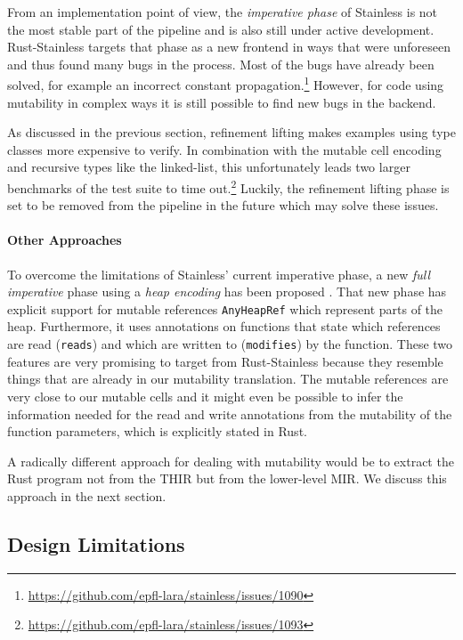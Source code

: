 From an implementation point of view, the \emph{imperative phase} of Stainless
is not the most stable part of the pipeline and is also still under active
development. Rust-Stainless targets that phase as a new frontend in ways that
were unforeseen and thus found many bugs in the process. Most of the bugs have
already been solved, for example an incorrect constant
propagation.\footnote{\url{https://github.com/epfl-lara/stainless/issues/1090}}
However, for code using mutability in complex ways it is still possible to find
new bugs in the backend.

As discussed in the previous section, refinement lifting makes examples using
type classes more expensive to verify. In combination with the mutable cell
encoding and recursive types like the linked-list, this unfortunately leads two
larger benchmarks of the test suite to time
out.\footnote{\url{https://github.com/epfl-lara/stainless/issues/1093}} Luckily,
the refinement lifting phase is set to be removed from the pipeline in the
future which may solve these issues.

\paragraph{Other Approaches}

To overcome the limitations of Stainless' current imperative phase, a
new \emph{full imperative} phase using a \emph{heap encoding} has been
proposed \cite{new-imperative}. That new phase has explicit support for
mutable references \passthrough{\lstinline!AnyHeapRef!} which represent
parts of the heap. Furthermore, it uses annotations on functions that
state which references are read (\passthrough{\lstinline!reads!}) and
which are written to (\passthrough{\lstinline!modifies!}) by the
function. These two features are very promising to target from
Rust-Stainless because they resemble things that are already in our
mutability translation. The mutable references are very close to our
mutable cells and it might even be possible to infer the information
needed for the read and write annotations from the mutability of the
function parameters, which is explicitly stated in Rust.

A radically different approach for dealing with mutability would be to
extract the Rust program not from the THIR but from the lower-level MIR.
We discuss this approach in the next section.

\subsection{Design Limitations}

